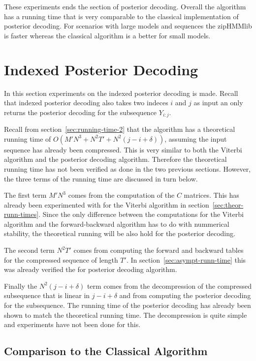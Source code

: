 These experiments ends the section of posterior decoding. Overall the algorithm
has a running time that is very comparable to the classical implementation of
posterior decoding. For scenarios with large models and sequences the zipHMMlib
is faster whereas the classical algorithm is a better for small models.

\section{Indexed Posterior Decoding}

In this section experiments on the indexed posterior decoding is
made. Recall that indexed posterior decoding also takes two indeces $i$ and
$j$ as input an only returns the posterior decoding for the subsequence
$Y_{i:j}$.

Recall from section~\ref{sec:running-time-2} that the algorithm has a
theoretical running time of $O(M' N^3 + N^2 T' + N^2 (j - i + \delta))$,
assuming the input sequence has already been compressed. This is very similar
to both the Viterbi algorithm and the posterior decoding algorithm. Therefore
the theoretical running time has not been verified as done in the two previous
sections. However, the three terms of the running time are discussed in turn
below.

The first term $M' N^3$ comes from the computation of the $C$ matrices. This
has already been experimented with for the Viterbi algorithm in
section~\ref{sec:theor-runn-times}. Since the only difference between the
computations for the Viterbi algorithm and the forward-backward algorithm has
to do with nummerical stability, the theoretical running will be also hold for
the posterior decoding.

The second term $N^2 T'$ comes from computing the forward and backward tables
for the compressed sequence of length $T'$. In
section~\ref{sec:asympt-runn-time} this was already verified the for posterior
decoding algorithm.

Finally the $N^2 (j - i + \delta)$ term comes from the decompression of the
compressed subsequence that is linear in $j - i + \delta$ and from computing
the posterior decoding for the subsequence. The running time of the posterior
decoding has already been shown to match the theoretical running time. The
decompression is quite simple and experiments have not been done for
this. 

\subsection{Comparison to the Classical Algorithm}

